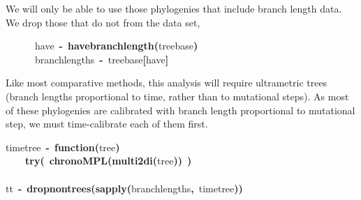 \documentclass[authoryear, preprint]{elsarticle}
\makeatletter
\newcommand{\hlfunctioncall}[1]{\textcolor[rgb]{.5,0,.33}{\textbf{#1}}}%
\newcommand{\hlkeyword}[1]{\textbf{#1}}%
\newcommand{\hlargument}[1]{\textcolor[rgb]{.69,.25,.02}{#1}}%
\newcommand{\hlformalargs}[1]{\hlargument{#1}}%
\newcommand{\hlassignement}[1]{\textbf{#1}}%
\newcommand{\hlsymbol}[1]{#1}%
\newcommand{\hlstd}[1]{\textcolor[rgb]{0,0,0}{#1}}%
\newenvironment{kframe}{%
 \def\FrameCommand##1{\hskip\@totalleftmargin \hskip-\fboxsep
 \colorbox{shadecolor}{##1}\hskip-\fboxsep
     \hskip-\linewidth \hskip-\@totalleftmargin \hskip\columnwidth}%
 \MakeFramed {\advance\hsize-\width
   \@totalleftmargin\z@ \linewidth\hsize
   \@setminipage}}%
 {\par\unskip\endMakeFramed}
\newenvironment{knitrout}{}{} %
\makeatother
\begin{document}
We will only be able to use those phylogenies that include branch length data.  We drop those that do not from the data set, 
\begin{knitrout}
\color{fgcolor}\begin{kframe}
\begin{flushleft}
\ttfamily\noindent
{\ }{\ }{\ }{\ }{\ }{\ }\hlsymbol{have}{\ }\hlassignement{\usebox{\hlnormalsizeboxlessthan}-}{\ }\hlfunctioncall{have\usebox{\hlnormalsizeboxunderscore}branchlength}\hlkeyword{(}\hlsymbol{treebase}\hlkeyword{)}\hspace*{\fill}\\
\hlstd{}{\ }{\ }{\ }{\ }{\ }{\ }\hlsymbol{branchlengths}{\ }\hlassignement{\usebox{\hlnormalsizeboxlessthan}-}{\ }\hlsymbol{treebase}\hlkeyword{[}\hlsymbol{have}\hlkeyword{]}\mbox{}
\normalfont
\end{flushleft}
\end{kframe}
\end{knitrout}


Like most comparative methods, this analysis will require ultrametric trees (branch lengths proportional to time, rather than to mutational steps). As most of these phylogenies are calibrated with branch length proportional to mutational step, we must time-calibrate each of them first.  
\begin{knitrout}
\color{fgcolor}\begin{kframe}
\begin{flushleft}
\ttfamily\noindent
\hlsymbol{timetree}{\ }\hlassignement{\usebox{\hlnormalsizeboxlessthan}-}{\ }\hlkeyword{function}\hlkeyword{(}\hlformalargs{tree}\hlkeyword{)}\hlkeyword{\usebox{\hlnormalsizeboxopenbrace}}\hspace*{\fill}\\
\hlstd{}{\ }{\ }{\ }{\ }\hlfunctioncall{try}\hlkeyword{(}{\ }\hlfunctioncall{chronoMPL}\hlkeyword{(}\hlfunctioncall{multi2di}\hlkeyword{(}\hlsymbol{tree}\hlkeyword{)}\hlkeyword{)}{\ }\hlkeyword{)}\hspace*{\fill}\\
\hlstd{}\hlkeyword{\usebox{\hlnormalsizeboxclosebrace}}\hspace*{\fill}\\
\hlstd{}\hlsymbol{tt}{\ }\hlassignement{\usebox{\hlnormalsizeboxlessthan}-}{\ }\hlfunctioncall{drop\usebox{\hlnormalsizeboxunderscore}nontrees}\hlkeyword{(}\hlfunctioncall{sapply}\hlkeyword{(}\hlsymbol{branchlengths}\hlkeyword{,}{\ }\hlsymbol{timetree}\hlkeyword{)}\hlkeyword{)}\mbox{}
\normalfont
\end{flushleft}
\end{kframe}
\end{knitrout}
\end{document}
